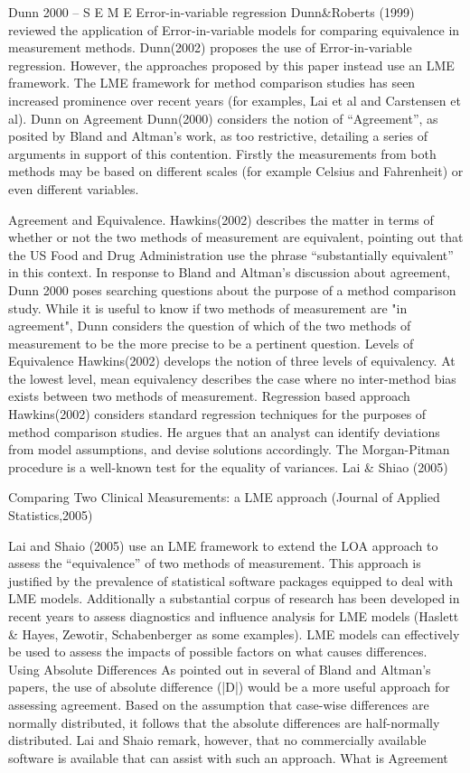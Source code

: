 Dunn 2000 – S E M E
Error-in-variable regression 
Dunn&Roberts (1999) reviewed the application of Error-in-variable models for comparing equivalence in measurement methods.
Dunn(2002) proposes the use of Error-in-variable regression. However, the approaches proposed by this paper instead use an LME framework. The LME framework for method comparison studies has seen increased prominence over recent years (for examples, Lai  et al and Carstensen et al).
Dunn on Agreement
Dunn(2000) considers the notion of “Agreement”, as posited by Bland and Altman’s work, as too restrictive, detailing a series of arguments in support of this contention. Firstly the measurements from both methods may be based on different scales (for example Celsius and Fahrenheit) or even different variables.

Agreement and Equivalence.
Hawkins(2002) describes the matter in terms of whether or not the two methods of measurement are equivalent, pointing out that the US Food and Drug Administration use the phrase “substantially equivalent” in this context.
In response to Bland and Altman's discussion about agreement, Dunn 2000 poses searching questions about the purpose of a method comparison study. While it is useful to know if two methods of measurement are "in agreement", Dunn considers the question of which of the two methods of measurement to be the more precise to be a pertinent question.
Levels of Equivalence
Hawkins(2002) develops the notion of three levels of equivalency. At the lowest level, mean equivalency describes the case where no inter-method bias exists between two methods of measurement.  
Regression based approach
Hawkins(2002) considers standard regression techniques for the purposes of method comparison studies.  He argues that an analyst can identify deviations from model assumptions, and devise solutions accordingly.
The Morgan-Pitman procedure is a well-known test for the equality of variances.
Lai & Shiao (2005)

Comparing Two Clinical Measurements: a LME approach (Journal of Applied Statistics,2005)

Lai and Shaio (2005) use an LME framework to extend the LOA approach to assess the “equivalence” of two methods of measurement.
This approach is justified by the prevalence of statistical software packages equipped to deal with LME models. Additionally a substantial corpus of research has been developed in recent years to assess diagnostics and influence analysis for LME models (Haslett & Hayes, Zewotir, Schabenberger as some examples).
LME models can effectively be used to assess the impacts of possible factors on what causes differences. 
Using Absolute Differences
As pointed out in several of Bland and Altman’s papers, the use of absolute difference (|D|) would be a more useful approach for assessing agreement. Based on the assumption that case-wise differences are normally distributed, it follows that the absolute differences are half-normally distributed.
Lai and Shaio remark, however, that no commercially available software is available that can assist with such an approach.
What is Agreement

